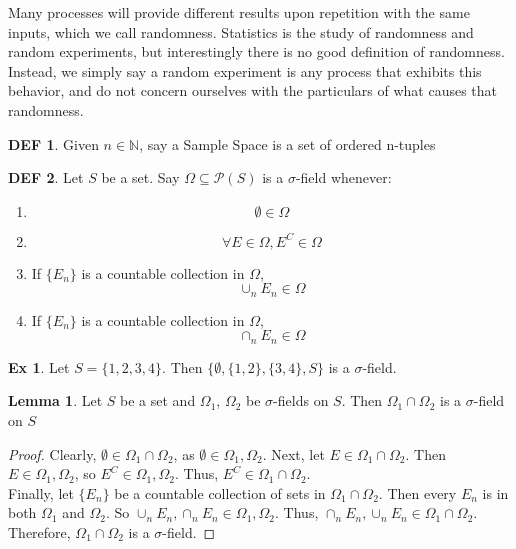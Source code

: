 \documentclass{article}
\theoremstyle{definition}\newtheorem{definition}{DEF}
\theoremstyle{definition}\newtheorem{example}{Ex}
\theoremstyle{lemma}\newtheorem{lemma}{Lemma}
\theoremstyle{corrolary}\newtheorem{corrolary}{Cor}
\begin{document}
Many processes will provide different results upon repetition with the same inputs, which we call randomness.
Statistics is the study of randomness and random experiments, but interestingly there is no good definition of randomness.
Instead, we simply say a random experiment is any process that exhibits this behavior, and do not concern ourselves with the particulars of what causes that randomness.

\begin{definition}
Given $n \in \mathbb{N}$, say a Sample Space is a set of ordered n-tuples
\end{definition}

\begin{definition}
Let $S$ be a set. Say $\Omega \subseteq \mathcal{P}(S)$ is a $\sigma$-field whenever:
\begin{enumerate}
\item \begin{equation}
\emptyset \in \Omega
\end{equation}
\item \begin{equation} 
 \forall E \in \Omega, E^C \in \Omega
 \end{equation}
\item If $\{E_n\}$ is a countable collection in $\Omega$, 
\begin{equation}
\cup_n E_n \in \Omega
\end{equation}
\item If $\{E_n\}$ is a countable collection in $\Omega$, 
\begin{equation}
\cap_n E_n \in \Omega
\end{equation}
\end{enumerate}
\end{definition}

\begin{example}
Let $S=\{1, 2, 3, 4\}$. Then $\{\emptyset, \{1,2\}, \{3,4\}, S\}$ is a $\sigma$-field.
\end{example}

\begin{lemma}
Let $S$ be a set and $\Omega_1$, $\Omega_2$ be $\sigma$-fields on $S$. Then $\Omega_1 \cap \Omega_2$ is a $\sigma$-field on $S$
\end{lemma}
\begin{proof}
Clearly, $\emptyset \in \Omega_1 \cap \Omega_2$, as $\emptyset \in \Omega_1, \Omega_2$.
Next, let $E\in \Omega_1 \cap \Omega_2$.
Then $E \in \Omega_1 , \Omega_2$, so $E^C \in \Omega_1 , \Omega_2$.
Thus, $E^C \in \Omega_1 \cap \Omega_2$. \\
Finally, let $\{E_n \}$ be a countable collection of sets in $\Omega_1 \cap \Omega_2$. 
Then every $E_n$ is in both $\Omega_1$ and $\Omega_2$.
So $\cup_n E_n, \cap_n E_n \in \Omega_1, \Omega_2$.
Thus, $\cap_n E_n, \cup_n E_n \in \Omega_1 \cap \Omega_2$.
Therefore, $\Omega_1 \cap \Omega_2$ is a $\sigma$-field.
\end{proof}
\end{document}
